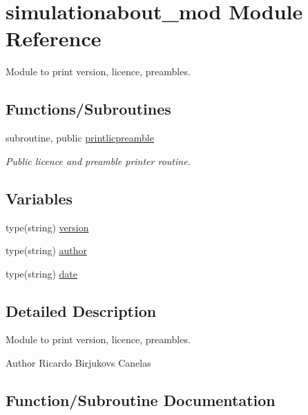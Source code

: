 \hypertarget{namespacesimulationabout__mod}{}\section{simulationabout\+\_\+mod Module Reference}
\label{namespacesimulationabout__mod}


Module to print version, licence, preambles.  


\subsection*{Functions/\+Subroutines}
\begin{DoxyCompactItemize}
\item 
subroutine, public \mbox{\hyperlink{namespacesimulationabout__mod_a4248c37e1b337cda7226a41aac346761}{printlicpreamble}}
\begin{DoxyCompactList}\small\item\em Public licence and preamble printer routine. \end{DoxyCompactList}\end{DoxyCompactItemize}
\subsection*{Variables}
\begin{DoxyCompactItemize}
\item 
type(string) \mbox{\hyperlink{namespacesimulationabout__mod_ab3a538e4f741e6ea5be60e667a966fda}{version}}
\item 
type(string) \mbox{\hyperlink{namespacesimulationabout__mod_a64b9a218dda33c3c5abdf4503b71e8a4}{author}}
\item 
type(string) \mbox{\hyperlink{namespacesimulationabout__mod_ab8debffcb94d9718e06501a71218ef26}{date}}
\end{DoxyCompactItemize}


\subsection{Detailed Description}
Module to print version, licence, preambles. 

\begin{DoxyAuthor}{Author}
Ricardo Birjukovs Canelas 
\end{DoxyAuthor}


\subsection{Function/\+Subroutine Documentation}
\mbox{\label{namespacesimulationabout__mod_a4248c37e1b337cda7226a41aac346761}} 
